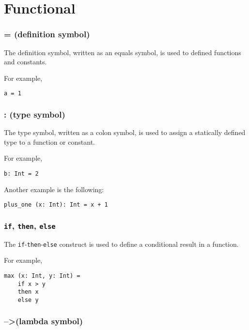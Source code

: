 \documentclass[12pt,a4paper]{book}
\newcommand{\srccode}[1]{\texttt{{#1}}}
\newcommand{\reservedWord}[1]{{\color{blue}\srccode{#1}}\xspace}
\newcommand{\sif}{\reservedWord{if}}
\newcommand{\sthen}{\reservedWord{then}}
\newcommand{\selse}{\reservedWord{else}}
\newcommand{\lambdaSymbol}{{\tiny--\textgreater}\xspace}
\begin{document}
    \section{Functional}

    \subsubsection{= (definition symbol)}

    The definition symbol, written as an equals symbol, is used to defined functions and constants.

    For example,
    \begin{lstlisting}[label={lst:exampleDef}]
  a = 1
    \end{lstlisting}

    \subsubsection{: (type symbol)}

    The type symbol, written as a colon symbol, is used to assign a statically defined type to a function or constant.

    For example,
    \begin{lstlisting}[label={lst:exampleType01}]
  b: Int = 2
    \end{lstlisting}

    Another example is the following:
    \begin{lstlisting}[label={lst:exampleType02}]
  plus_one (x: Int): Int = x + 1
    \end{lstlisting}

    \subsubsection{\sif, \sthen, \selse}

    The \sif-\sthen-\selse construct is used to define a conditional result in a function.

    For example,
    \begin{lstlisting}[label={lst:exampleIfThenElse}]
  max (x: Int, y: Int) =
    if x > y
    then x
    else y
    \end{lstlisting}

    \subsubsection{\lambdaSymbol (lambda symbol)}
\end{document}
